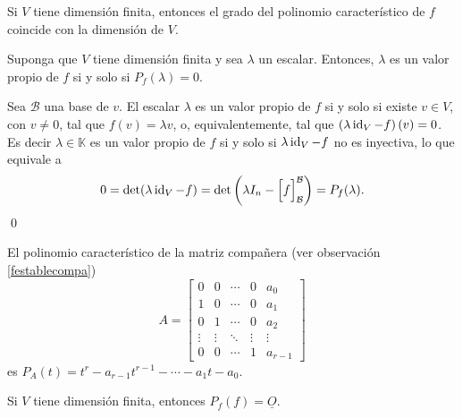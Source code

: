 \begin{obs}
  Si $V$ tiene dimensión finita, entonces el grado del polinomio característico de $f$ coincide con la dimensión de $V$.
\end{obs}

\begin{teo}
Suponga que $V$ tiene dimensi\'on finita y sea $\lambda$ un escalar. Entonces, $\lambda$ es un valor propio de $f$ si y solo si $P_f(\lambda)=0$.
\end{teo}

\dem Sea $\mathcal{B}$ una base de $v$. El escalar $\lambda$ es un valor propio de $f$ si y solo si existe $v\in V$, con $v\ne 0$, tal que $f(v)=\lambda v$, o, equivalentemente, tal que $\left(\lambda\operatorname{id}_V-f\right)(v)=0$. Es decir $\lambda\in \mathbb{K}$ es un valor propio de $f$ si y solo si $\lambda\operatorname{id}_V-f$ no es inyectiva, lo que equivale a
\[
0=\det(\lambda\operatorname{id}_V-f)=\det\left(\lambda I_n-\Big[f\Big]^{\mathcal{B}}_{\mathcal{B}}\right)=P_f(\lambda).
\]
\qed

\begin{obs}\label{observacionesparacayleyhamilton}
  El polinomio característico de la matriz compañera (ver observación \ref{festablecompa})
  $$
  A=\left[\begin{array}{ccccc}
    0 & 0 & \cdots & 0 & a_0\\
    1 & 0 & \cdots & 0 & a_1\\
    0 & 1 & \cdots & 0 & a_2\\
    \vdots & \vdots & \ddots & \vdots & \vdots\\
    0 & 0 & \cdots & 1 & a_{r-1}
  \end{array}\right]
  $$
  es $P_A(t)=t^r-a_{r-1}t^{r-1}-\cdots-a_1t-a_0$.
\end{obs}

\begin{teo}\label{cayleyhamilton}
  Si $V$ tiene dimensi\'on finita, entonces $P_f(f)=\underline{O}$.
\end{teo}

